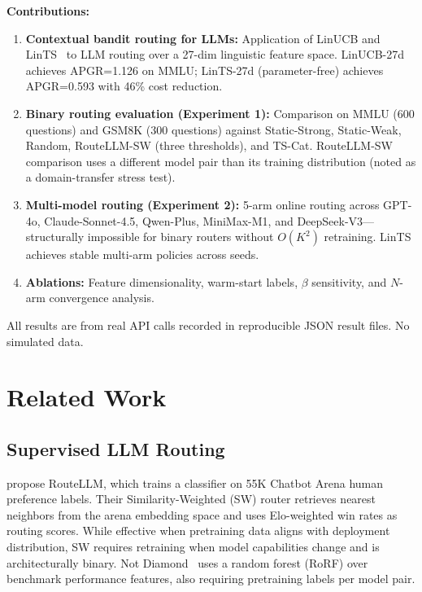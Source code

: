\documentclass[11pt]{article}
\begin{document}
\textbf{Contributions:}
\begin{enumerate}
    \item \textbf{Contextual bandit routing for LLMs:} Application of LinUCB and LinTS~\cite{li2010contextual, abeille2017linear} to LLM routing over a 27-dim linguistic feature space. LinUCB-27d achieves APGR=1.126 on MMLU; LinTS-27d (parameter-free) achieves APGR=0.593 with 46\% cost reduction.
    \item \textbf{Binary routing evaluation (Experiment 1):} Comparison on MMLU (600 questions) and GSM8K (300 questions) against Static-Strong, Static-Weak, Random, RouteLLM-SW (three thresholds), and TS-Cat. RouteLLM-SW comparison uses a different model pair than its training distribution (noted as a domain-transfer stress test).
    \item \textbf{Multi-model routing (Experiment 2):} 5-arm online routing across GPT-4o, Claude-Sonnet-4.5, Qwen-Plus, MiniMax-M1, and DeepSeek-V3---structurally impossible for binary routers without $O(K^2)$ retraining. LinTS achieves stable multi-arm policies across seeds.
    \item \textbf{Ablations:} Feature dimensionality, warm-start labels, $\beta$ sensitivity, and $N$-arm convergence analysis.
\end{enumerate}

All results are from real API calls recorded in reproducible JSON result files. No simulated data.

\section{Related Work}
\label{sec:related}

\subsection{Supervised LLM Routing}

\cite{ong2024routellm} propose RouteLLM, which trains a classifier on 55K Chatbot Arena human preference labels. Their Similarity-Weighted (SW) router retrieves nearest neighbors from the arena embedding space and uses Elo-weighted win rates as routing scores. While effective when pretraining data aligns with deployment distribution, SW requires retraining when model capabilities change and is architecturally binary. Not Diamond~\cite{notdiamond2024} uses a random forest (RoRF) over benchmark performance features, also requiring pretraining labels per model pair.
\end{document}
